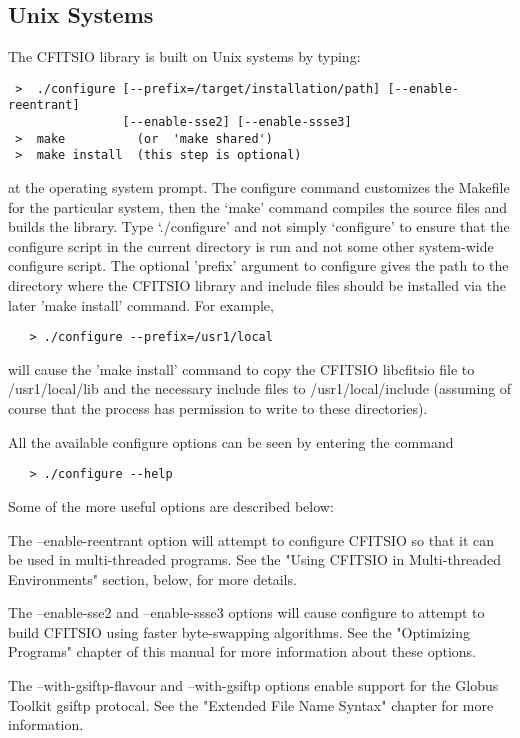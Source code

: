 \documentclass[11pt]{book}
\begin{document}
\subsection{Unix Systems}

The CFITSIO library is built on Unix systems by typing:

\begin{verbatim}
 >  ./configure [--prefix=/target/installation/path] [--enable-reentrant]
                [--enable-sse2] [--enable-ssse3]
 >  make          (or  'make shared')
 >  make install  (this step is optional)
\end{verbatim}
at the operating system prompt.  The configure command customizes the
Makefile for the particular system, then the `make' command compiles the
source files and builds the library.  Type `./configure' and not simply
`configure' to ensure that the configure script in the current directory
is run and not some other system-wide configure script.  The optional
'prefix' argument to configure gives the path to the directory where
the CFITSIO library and include files should be installed via the later
'make install' command. For example,

\begin{verbatim}
   > ./configure --prefix=/usr1/local
\end{verbatim}
will cause the 'make install' command to copy the CFITSIO libcfitsio file
to /usr1/local/lib and the necessary include files to /usr1/local/include
(assuming of course that the  process has permission to write to these
directories).

All the available configure options can be seen by entering the command

\begin{verbatim}
   > ./configure --help
\end{verbatim}
Some of the more useful options are described below:

The --enable-reentrant option will attempt to configure CFITSIO
so that it can be used in multi-threaded programs.  See the
"Using CFITSIO in Multi-threaded Environments" section, below, for more details.

The --enable-sse2 and --enable-ssse3 options will cause configure to
attempt to build CFITSIO using faster byte-swapping algorithms.
See the "Optimizing Programs" chapter of this manual for
more information about these options.

The --with-gsiftp-flavour and --with-gsiftp options enable support for the Globus
Toolkit gsiftp protocal.  See the "Extended File Name Syntax" chapter for more
information.
\end{document}
